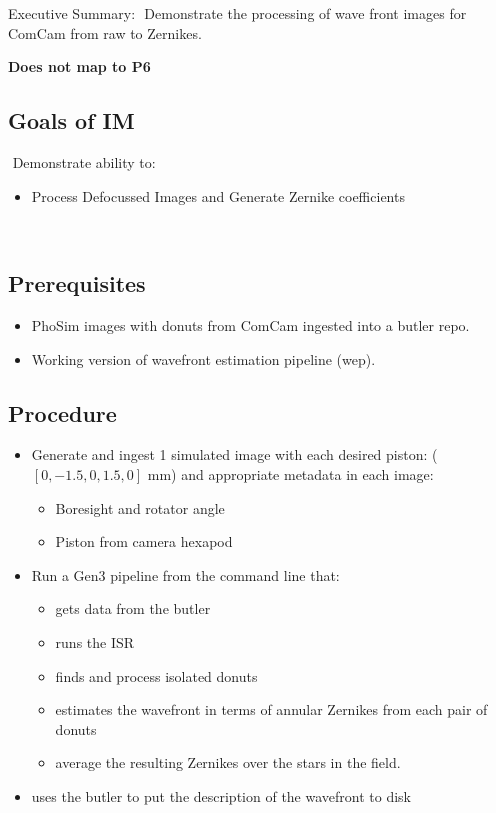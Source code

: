Executive Summary:
​
Demonstrate the processing of wave front images for ComCam from raw to Zernikes.

\textbf{Does not map to P6}
​
\subsection{Goals of IM}
​
Demonstrate ability to:
​
\begin{itemize}
\item Process Defocussed Images and Generate Zernike coefficients
\end{itemize}
​
\subsection{Prerequisites}
\begin{itemize}
\item PhoSim images with donuts from ComCam ingested into a butler repo.
\item Working version of wavefront estimation pipeline (wep). 
\end{itemize}

\subsection{Procedure}
\begin{itemize}
\item Generate and ingest 1 simulated image with each desired piston: ($[0, -1.5, 0, 1.5, 0]$ mm)
  and appropriate
  metadata in each image:
  \begin{itemize}
  \item Boresight and rotator angle
  \item Piston from camera hexapod
  \end{itemize}
\item Run a Gen3 pipeline from the command line that:
  \begin{itemize}
  \item gets data from the butler
  \item runs the ISR
  \item finds and process isolated donuts
  \item estimates the wavefront in terms of annular Zernikes from each pair of donuts
  \item average the resulting Zernikes over the stars in the field.
  \end{itemize}
  \item uses the butler to put the description of the wavefront to disk
\end{itemize}

